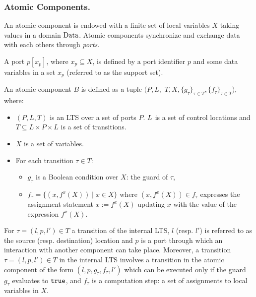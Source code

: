 \subsubsection{Atomic Components.}
%
An atomic component is endowed with a finite set of local variables $X$ taking values in a domain $\mathit{\Data}$. Atomic components synchronize and exchange data with each others through \emph{ports}.
%
\begin{definition}[Port]
A port $p[x_p]$, where $x_p\subseteq X$, is defined by a port identifier $p$ and some data variables in a set $x_p$ (referred to as the support set). %
\end{definition}
%
%
\begin{definition}
An atomic component $B$ is defined as a tuple $(P,L,$ $T,X,\{g_\tau\}_{\tau \in T}, \{f_{ \tau}\}_{\tau \in T})$, 
where:
\begin{itemize}
\item $(P,L,T)$ is an LTS over a set of ports $P$. $L\ignore{=\{l_1,l_2,\ldots,l_k\}}$ is a set of control locations and $T \subseteq L \times P \times L$ is a set of transitions.
\item $X$ is a set of variables.
\item For each transition $\tau \in T$: 
\begin{itemize}
\item $g_{\tau}$ is a Boolean condition over $X$: the guard of $\tau$,
\item $f_\tau = \{ (x, f^x(X)) \mid x\in X\}$ where $(x,f^x(X)) \in f_\tau$ expresses the assignment statement $x := f^x(X)$ updating $x$ with the value of the expression $f^x(X)$. 
\end{itemize}
\end{itemize}
\end{definition}
%
For $\tau = (l,p,l')\in T$ a transition of the internal LTS, $l$ (resp. $l'$) is referred to as the source (resp.
destination) location and $p$ is a port through which an interaction with another component can take place. Moreover, a transition $\tau = (l,p,l')\in T$ in the internal LTS involves a transition in the atomic component of the form $(l,p,g_\tau,f_\tau,l')$ which can be executed only if the guard $g_\tau$ evaluates to $\true$, and $f_\tau$ is a computation step: a set of assignments to local variables in $X$.


